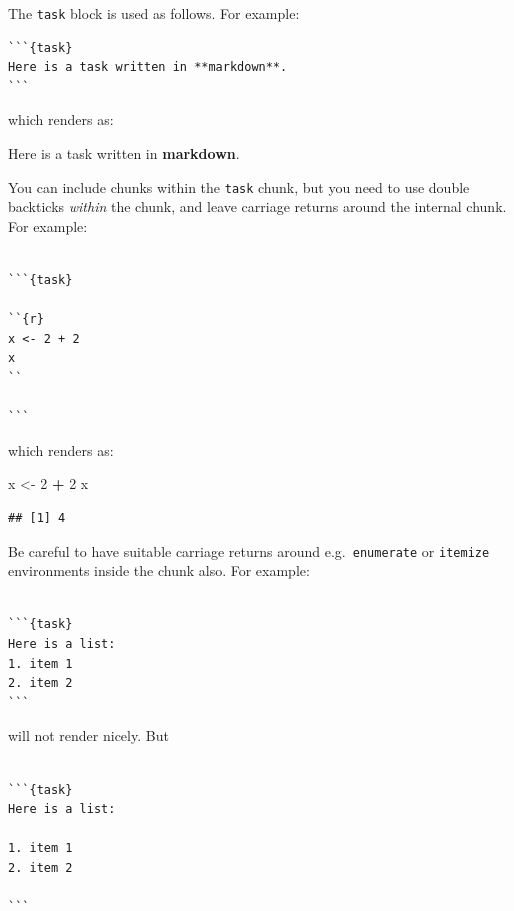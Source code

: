 \documentclass[
  oneside]{krantz}
\newenvironment{Shaded}{\begin{snugshade}}{\end{snugshade}}
\newcommand{\DecValTok}[1]{\textcolor[rgb]{0.00,0.00,0.81}{#1}}
\newcommand{\NormalTok}[1]{#1}
\newcommand{\OperatorTok}[1]{\textcolor[rgb]{0.81,0.36,0.00}{\textbf{#1}}}
\newcommand{\StringTok}[1]{\textcolor[rgb]{0.31,0.60,0.02}{#1}}
\newcommand{\bblockT}[2][Task]{\begin{tcolorbox}[title = #1 #2, parbox = false]}
\newcommand{\eblockT}{\end{tcolorbox}}
\theoremstyle{definition}
\theoremstyle{definition}
\theoremstyle{definition}
\theoremstyle{remark}
\begin{document}
The \texttt{task} block is used as follows. For example:

\begin{verbatim}
```{task}
Here is a task written in **markdown**.
```
\end{verbatim}

which renders as:

\hypertarget{tsk1}{}\bblockT[Task]{\phantomsection\label{sol1}1}

Here is a task written in \textbf{markdown}.
\eblockT

You can include chunks within the \texttt{task} chunk, but you need to use double backticks \emph{within} the chunk, and leave carriage returns around the internal chunk. For example:

\begin{verbatim}

```{task}

``{r}
x <- 2 + 2
x
``

```
\end{verbatim}

which renders as:

\hypertarget{tsk2}{}\bblockT[Task]{\phantomsection\label{sol2}2}

\begin{Shaded}
\begin{Highlighting}[]
\NormalTok{x <-}\StringTok{ }\DecValTok{2} \OperatorTok{+}\StringTok{ }\DecValTok{2}
\NormalTok{x}
\end{Highlighting}
\end{Shaded}

\begin{verbatim}
## [1] 4
\end{verbatim}

\eblockT

Be careful to have suitable carriage returns around e.g.~\texttt{enumerate} or \texttt{itemize} environments inside the chunk also. For example:

\begin{verbatim}

```{task}
Here is a list:
1. item 1
2. item 2
```
\end{verbatim}

will not render nicely. But

\begin{verbatim}

```{task}
Here is a list:

1. item 1
2. item 2

```
\end{verbatim}
\end{document}
